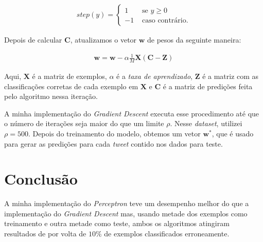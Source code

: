 \documentclass[a4paper, 12pt]{article}
\begin{document}
\begin{align*}
    step(y) = \begin{cases}
        1 & \text{ se } y \geq 0 \\
        -1 & \text{ caso contrário.}
    \end{cases}
\end{align*}

Depois de calcular $\boldsymbol{C}$,  atualizamos o vetor $\boldsymbol{w}$
de pesos da seguinte maneira:

\begin{align*}
    \boldsymbol{w} = \boldsymbol{w} - \alpha \frac{1}{M} \boldsymbol{X}(\boldsymbol{C} - \boldsymbol{Z})
\end{align*}

Aqui, $\boldsymbol{X}$ é a matriz de exemplos, $\alpha$ é a \textit{taxa de
aprendizado}, $\boldsymbol{Z}$ é a matriz com as classificações corretas de
cada exemplo em $\boldsymbol{X}$ e $\boldsymbol{C}$ é a matriz de predições
feita pelo algoritmo nessa iteração.

A minha implementação do \textit{Gradient Descent} executa esse procedimento
até que o número de iterações seja maior do que um limite $\rho$. Nesse
\textit{dataset}, utilizei $\rho = 500$. Depois do treinamento do modelo,
obtemos um vetor $\boldsymbol{w}^{*}$, que é usado para gerar as predições para cada
\textit{tweet} contido nos dados para teste.

\section{Conclusão} \label{sec:concl}

A minha implementação do \textit{Perceptron} teve um desempenho melhor do que a
implementação do \textit{Gradient Descent} mas, usando metade dos exemplos como
treinamento e outra metade como teste, ambos os algoritmos atingiram resultados
de por volta de $10\%$ de exemplos classificados erroneamente.
\end{document}

